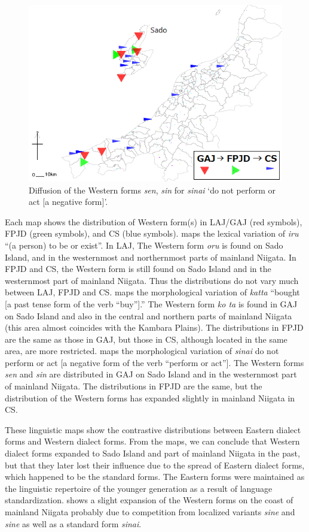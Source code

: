 \documentclass[output=paper]{LSP/langsci}
\begin{document}
\begin{figure}
\includegraphics[width=.75\textwidth]{illustrations/fuku2_fig2c}
\caption{Diffusion of the Western forms \textit{sen}, \textit{sin} for \textit{sinai} `do not perform or act [a negative form]'.}
\label{fig:2c}
\end{figure}

Each map shows the distribution of Western form(s) in LAJ/GAJ (red symbols), FPJD (green symbols), and CS (blue symbols).   maps the lexical variation of \textit{iru} “(a person) to be or exist”.  In LAJ, The Western form \textit{oru} is found on Sado Island, and in the westernmost and northernmost parts of mainland Niigata.  In FPJD and CS, the Western form is still found on Sado Island and in the westernmost part of mainland Niigata.  Thus the distributions do not vary much between LAJ, FPJD and CS.   maps the morphological variation of \textit{katta} “bought [a past tense form of the verb “buy”].”  The Western form \textit{ko
ta} is found in GAJ on Sado Island and also in the central and northern parts of mainland Niigata (this area almost coincides with the Kambara Plains).  The distributions in FPJD are the same as those in GAJ, but those in CS, although located in the same area, are more restricted.   maps the morphological variation of \textit{sinai} {\textquotedbl}do not perform or act [a negative form of the verb “perform or act”].{\textquotedbl} The Western forms \textit{sen} and \textit{sin} are distributed in GAJ on Sado Island and in the westernmost part of mainland Niigata. The distributions in FPJD are the same, but the distribution of the Western forms has expanded slightly  in mainland Niigata in CS.

These linguistic maps show the contrastive distributions between Eastern dialect forms and Western dialect forms.  From the maps, we can conclude that Western dialect forms expanded to Sado Island and part of mainland Niigata in the past, but that they later lost their influence due to the spread of Eastern dialect forms, which happened to be the standard forms. The Eastern forms were maintained as the linguistic repertoire of the younger generation as a result of language standardization.  shows a slight expansion of the Western forms on the coast of mainland Niigata probably due to  competition from localized variants \textit{sine} and \textit{sine
} as well as a standard form \textit{sinai}.  
\end{document}

